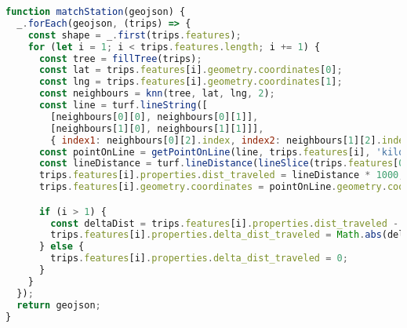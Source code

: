 \begin{newpage}
\begin{lstlisting}[captionpos=t, caption=Station Matching, label=lst:match_station, language=JavaScript]
function matchStation(geojson) {
  _.forEach(geojson, (trips) => {
    const shape = _.first(trips.features);
    for (let i = 1; i < trips.features.length; i += 1) {
      const tree = fillTree(trips);
      const lat = trips.features[i].geometry.coordinates[0];
      const lng = trips.features[i].geometry.coordinates[1];
      const neighbours = knn(tree, lat, lng, 2);
      const line = turf.lineString([
        [neighbours[0][0], neighbours[0][1]],
        [neighbours[1][0], neighbours[1][1]]],
        { index1: neighbours[0][2].index, index2: neighbours[1][2].index });
      const pointOnLine = getPointOnLine(line, trips.features[i], 'kilometers');
      const lineDistance = turf.lineDistance(lineSlice(trips.features[0].geometry.coordinates[0], pointOnLine, shape));
      trips.features[i].properties.dist_traveled = lineDistance * 1000;
      trips.features[i].geometry.coordinates = pointOnLine.geometry.coordinates;

      if (i > 1) {
        const deltaDist = trips.features[i].properties.dist_traveled - trips.features[i - 1].properties.dist_traveled;
        trips.features[i].properties.delta_dist_traveled = Math.abs(deltaDist);
      } else {
        trips.features[i].properties.delta_dist_traveled = 0;
      }
    }
  });
  return geojson;
}

\end{lstlisting}

\end{newpage}